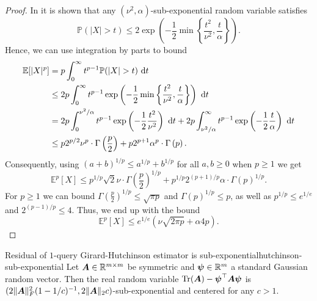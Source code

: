 \begin{proof}
    In \cite[Proposition 2.9]{wainwright-2019-highdimensional-statistics} it is shown that any $(\nu^2, \alpha)$-sub-exponential random variable satisfies
    \begin{equation}
        \mathbb{P}(|X| > t) \leq 2 \exp\left(-\frac{1}{2}\min\left\{\frac{t^2}{\nu^2}, \frac{t}{\alpha}\right\}\right).
    \end{equation}
    Hence, we can use integration by parts to bound
    \begin{align}
        \mathbb{E}[|X|^p] 
        &= p \int_{0}^{\infty} t^{p-1} \mathbb{P}(|X| > t)~\mathrm{d}t \notag \\
        &\leq 2 p \int_{0}^{\infty} t^{p-1} \exp\left(-\frac{1}{2}\min\left\{\frac{t^2}{\nu^2}, \frac{t}{\alpha}\right\}\right)~\mathrm{d}t  \notag \\ 
        &= 2 p \int_{0}^{\nu^2 / \alpha} t^{p-1} \exp\left(-\frac{1}{2} \frac{t^2}{\nu^2} \right)~\mathrm{d}t + 2 p \int_{\nu^2 / \alpha}^{\infty} t^{p-1} \exp\left(-\frac{1}{2} \frac{t}{\alpha} \right)~\mathrm{d}t \notag \\
        &\leq p 2^{p/2} \nu^p \cdot \Gamma\left(\frac{p}{2}\right) + p 2^{p+1} \alpha^p \cdot \Gamma\left(p\right).
    \end{align}
    Consequently, using $(a + b)^{1/p} \leq a^{1/p} + b^{1/p}$ for all $a,b \geq 0$ when $p \geq 1$ we get
    \begin{equation}
        \mathbb{E}^p[X] 
        \leq p^{1/p} \sqrt{2} \nu \cdot \Gamma\left(\frac{p}{2}\right)^{1/p} + p^{1/p} 2^{(p+1)/p} \alpha \cdot \Gamma\left(p\right)^{1/p}.
    \end{equation}
    For $p \geq 1$ we can bound $\Gamma\left(\frac{p}{2}\right)^{1/p} \leq \sqrt{\pi p}$ and $\Gamma\left(p\right)^{1/p} \leq p$, as well as $p^{1/p} \leq e^{1/e}$ and $2^{(p-1)/p} \leq 4$. Thus, we end up with the bound
    \begin{equation}
        \mathbb{E}^p[X] \leq e^{1/e} (\nu \sqrt{2 \pi p} + \alpha 4 p).
    \end{equation} 
\end{proof}

\begin{lemma}{Residual of $1$-query Girard-Hutchinson estimator is sub-exponential}{hutchinson-sub-exponential}
    Let $\boldsymbol{A} \in \mathbb{R}^{m \times m}$ be symmetric and $\boldsymbol{\psi} \in \mathbb{R}^m$ a standard Gaussian random vector. Then the real random variable $\operatorname{Tr}(\boldsymbol{A}) - \boldsymbol{\psi}^{\top} \boldsymbol{A} \boldsymbol{\psi}$ is $(2 \lVert \boldsymbol{A} \rVert _F^2 (1 - 1/c)^{-1}, 2 \lVert \boldsymbol{A} \rVert _2 c )$-sub-exponential and centered for any $c > 1$.
\end{lemma}

